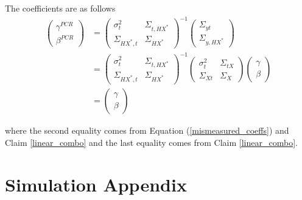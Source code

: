 \documentclass[10pt]{article}
\makeatletter
\renewenvironment{proof}[1][\proofname] {\par\pushQED{\qed}\normalfont\topsep6\p@\@plus6\p@\relax\trivlist\item[\hskip\labelsep\bfseries#1\@addpunct{.}]\ignorespaces}{\popQED\endtrivlist\@endpefalse}
\makeatother
\begin{document}
        \begin{proof}
        The coefficients are as follows
                \begin{align*}
                    \left(\begin{array}{l}
                {\gamma}^{PCR} \\
                {\beta}^{PCR}
                \end{array}\right)&=\left(\begin{array}{cc}
                {\sigma}^2_{t} & \Sigma_{t,HX^*} \\
                \Sigma_{HX^*,t} & {\Sigma}_{HX^*}
                \end{array}\right)^{-1}\left(\begin{array}{c}
                \Sigma_{yt} \\
                \Sigma_{y,HX^*}
                \end{array}\right)\\
                &=\left(\begin{array}{cc}
                {\sigma}^2_{t} & \Sigma_{t,HX^*} \\
                \Sigma_{HX^*,t} & {\Sigma}_{HX^*}
                \end{array}\right)^{-1}\left(\begin{array}{cc}
                {\sigma}^2_{t} & \Sigma_{tX} \\
                \Sigma_{Xt} & {\Sigma}_{X}
                \end{array}\right)\left(\begin{array}{l}
                {\gamma} \\
                {\beta}
                \end{array}\right)\\
                &=\left(\begin{array}{l}
                {\gamma} \\
                {\beta}
                \end{array}\right)
                \end{align*}
                
                where the second equality comes from Equation (\ref{mismeasured_coeffs}) and Claim \ref{linear_combo} and the last equality comes from Claim \ref{linear_combo}.
        \end{proof}

\clearpage

    \section*{Simulation Appendix}
\end{document}
